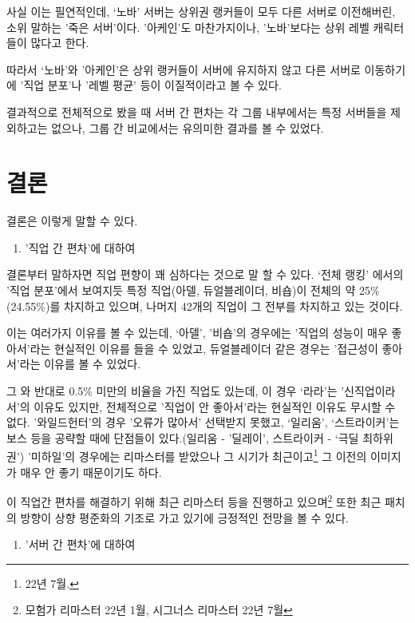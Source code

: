\documentclass[
]{article}
\providecommand{\tightlist}{%
  \setlength{\itemsep}{0pt}\setlength{\parskip}{0pt}}
\begin{document}
사실 이는 필연적인데, `노바' 서버는 상위권 랭커들이 모두 다른 서버로
이전해버린, 소위 말하는 '죽은 서버'이다. '아케인'도 마찬가지이나,
'노바'보다는 상위 레벨 캐릭터들이 많다고 한다.

따라서 `노바'와 '아케인'은 상위 랭커들이 서버에 유지하지 않고 다른
서버로 이동하기에 '직업 분포'나 '레벨 평균' 등이 이질적이라고 볼 수
있다.

결과적으로 전체적으로 봤을 때 서버 간 편차는 각 그룹 내부에서는 특정
서버들을 제외하고는 없으나, 그룹 간 비교에서는 유의미한 결과를 볼 수
있었다.

\hypertarget{uxacb0uxb860}{%
\section{결론}\label{uxacb0uxb860}}

결론은 이렇게 말할 수 있다.

\begin{enumerate}
\def\labelenumi{\arabic{enumi}.}
\tightlist
\item
  '직업 간 편차'에 대하여
\end{enumerate}

결론부터 말하자면 직업 편향이 꽤 심하다는 것으로 말 할 수 있다. `전체
랭킹' 에서의 '직업 분포'에서 보여지듯 특정 직업(아델, 듀얼블레이더,
비숍)이 전체의 약 25\%(24.55\%)를 차지하고 있으며, 나머지 42개의 직업이
그 전부를 차지하고 있는 것이다.

이는 여러가지 이유를 볼 수 있는데, `아델', '비숍'의 경우에는 '직업의
성능이 매우 좋아서'라는 현실적인 이유를 들을 수 있었고, 듀얼블레이더
같은 경우는 '접근성이 좋아서'라는 이유를 볼 수 있었다.

그 와 반대로 0.5\% 미만의 비율을 가진 직업도 있는데, 이 경우 `라라'는
'신직업이라서'의 이유도 있지만, 전체적으로 '직업이 안 좋아서'라는
현실적인 이유도 무시할 수 없다. '와일드헌터'의 경우 '오류가 많아서'
선택받지 못했고, `일리움', `스트라이커'는 보스 등을 공략할 때에 단점들이
있다.(일리움 - '딜레이', 스트라이커 - `극딜 최하위권') '미하일'의
경우에는 리마스터를 받았으나 그 시기가 최근이고\footnote{22년 7월.} 그
이전의 이미지가 매우 안 좋기 때문이기도 하다.

이 직업간 편차를 해결하기 위해 최근 리마스터 등을 진행하고
있으며\footnote{모험가 리마스터 22년 1월, 시그너스 리마스터 22년 7월}
또한 최근 패치의 방향이 상향 평준화의 기조로 가고 있기에 긍정적인 전망을
볼 수 있다.

\begin{enumerate}
\def\labelenumi{\arabic{enumi}.}
\setcounter{enumi}{1}
\tightlist
\item
  '서버 간 편차'에 대하여
\end{enumerate}
\end{document}
